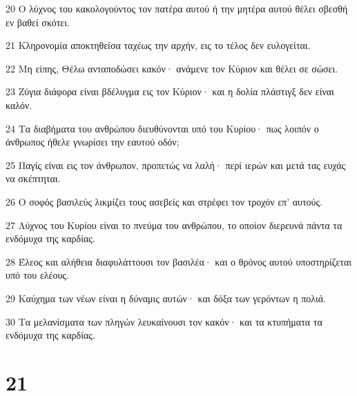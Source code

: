 \par 20 Ο λύχνος του κακολογούντος τον πατέρα αυτού ή την μητέρα αυτού θέλει σβεσθή εν βαθεί σκότει.
\par 21 Κληρονομία αποκτηθείσα ταχέως την αρχήν, εις το τέλος δεν ευλογείται.
\par 22 Μη είπης, Θέλω ανταποδώσει κακόν· ανάμενε τον Κύριον και θέλει σε σώσει.
\par 23 Ζύγια διάφορα είναι βδέλυγμα εις τον Κύριον· και η δολία πλάστιγξ δεν είναι καλόν.
\par 24 Τα διαβήματα του ανθρώπου διευθύνονται υπό του Κυρίου· πως λοιπόν ο άνθρωπος ήθελε γνωρίσει την εαυτού οδόν;
\par 25 Παγίς είναι εις τον άνθρωπον, προπετώς να λαλή· περί ιερών και μετά τας ευχάς να σκέπτηται.
\par 26 Ο σοφός βασιλεύς λικμίζει τους ασεβείς και στρέφει τον τροχόν επ' αυτούς.
\par 27 Λύχνος του Κυρίου είναι το πνεύμα του ανθρώπου, το οποίον διερευνά πάντα τα ενδόμυχα της καρδίας.
\par 28 Έλεος και αλήθεια διαφυλάττουσι τον βασιλέα· και ο θρόνος αυτού υποστηρίζεται υπό του ελέους.
\par 29 Καύχημα των νέων είναι η δύναμις αυτών· και δόξα των γερόντων η πολιά.
\par 30 Τα μελανίσματα των πληγών λευκαίνουσι τον κακόν· και τα κτυπήματα τα ενδόμυχα της καρδίας.

\chapter{21}

